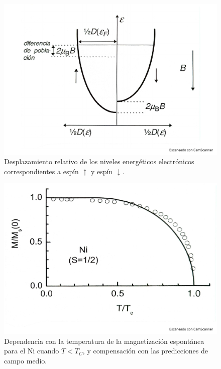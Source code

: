 \begin{figure}[h!] \centering
	\includegraphics[scale=0.35]{Cuerpo/Ch_10/Fotos libro 3.pdf}
	\caption{Desplazamiento relativo de los niveles energéticos electrónicos correspondientes a espín $\uparrow$ y espín $\downarrow$.}
	\label{Fig:10-03}
\end{figure}
\begin{figure}[h!] \centering
	\includegraphics[scale=0.35]{Cuerpo/Ch_10/Fotos libro 4.pdf}
	\caption{Dependencia con la temperatura de la magnetización espontánea para el Ni cuando $T<T_C$, y compensación con las predicciones de campo medio.}
	\label{Fig:10-04}
\end{figure}

